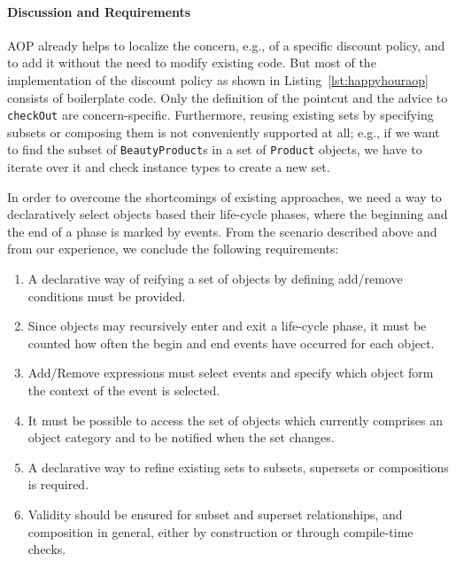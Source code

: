 \paragraph{Discussion and Requirements}

AOP already helps to localize the concern, e.g., of a specific discount policy, and to add it without the need to modify existing code.
But most of the implementation of the discount policy as shown in Listing~\ref{lst:happyhouraop} consists of boilerplate code. Only the definition of the pointcut and the advice to \texttt{checkOut} are concern-specific.
Furthermore, reusing existing sets by specifying subsets or composing them is not conveniently supported at all; e.g., if we want to find the subset of \texttt{BeautyProduct}s in a set of \texttt{Product} objects, we have to iterate over it and check instance types to create a new set.

In order to overcome the shortcomings of existing approaches, we need a way to declaratively select objects based their life-cycle phases, where the beginning and the end of a phase is marked by events. From the scenario described above and from our experience, we conclude the following requirements:

\begin{enumerate}[{Requirement}1{:}]
\item A declarative way of reifying a set of objects by defining add/remove conditions must be provided.
\item Since objects may recursively enter and exit a life-cycle phase, it must be counted how often the begin and end events have occurred for each object.
\item Add/Remove expressions must select events and specify which object form the context of the event is selected.
\item It must be possible to access the set of objects which currently comprises an object category and to be notified when the set changes.
\item A declarative way to refine existing sets to subsets, supersets or compositions is required.
\item Validity should be ensured for subset and superset relationships, and composition in general, either by construction or through compile-time checks.
\end{enumerate}
